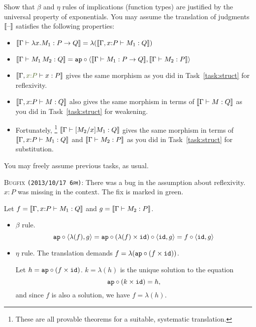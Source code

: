 \documentclass[12pt]{article}
\newcommand{\cut}[1]{}
\newcommand{\showsol}[1]{\color{FireBrick}#1\normalcolor}%
\newcommand{\showsol}[1]{\cut{#1}}%
\newenvironment{sol}{\trivlist \item[\hskip \labelsep{\bf
Solution:}]}{\endtrivlist}
\newcommand{\showextra}[1]{\color{DarkOliveGreen}#1\normalcolor}
\begin{document}
\begin{task}
  Show that $\beta$ and $\eta$ rules of implications (function types)
  are justified by the universal property of exponentials.
  You may assume the translation of judgments $\llbracket \text{--}\rrbracket$
  satisfies the following properties:
  \begin{itemize}
    \item $\llbracket \Gamma \vdash \lambda x.M_1 : P \to Q\rrbracket
      = \lambda (\llbracket \Gamma, x{:}P \vdash M_1 : Q\rrbracket)$
    \item $\llbracket \Gamma \vdash M_1\,M_2 : Q\rrbracket
      = \mathtt{ap} \mathbin{\circ} \langle \llbracket \Gamma \vdash M_1 : P \to Q\rrbracket,\llbracket \Gamma \vdash M_2 : P\rrbracket\rangle$
    \item
      $\sem{\Gamma, \showextra{x{:}P} \entails x : P}$ gives the same morphism
      as you did in Task~\ref{task:struct} for reflexivity.
    \item
      $\llbracket \Gamma, x{:}P \vdash M : Q\rrbracket$ also gives the same morphism
      in terms of $\llbracket \Gamma \vdash M : Q\rrbracket$
      as you did in Task~\ref{task:struct} for weakening.
    \item
      Fortunately,%
      \footnote{These are all provable theorems for a suitable, systematic translation.}
      $\llbracket \Gamma \vdash [M_2/x]M_1 : Q\rrbracket$ gives the same morphism
      in terms of $\llbracket \Gamma, x{:}P \vdash M_1 : Q\rrbracket$ and $\llbracket \Gamma \vdash M_2 : P\rrbracket$
      as you did in Task~\ref{task:struct} for substitution.
  \end{itemize}
  You may freely assume previous tasks, as usual.
\end{task}
\showextra{
  \begin{mdframed}[style=extra]
    \textsc{Bugfix \texttt{(2013/10/17 6pm)}:}
    There was a bug in the assumption about reflexivity.
    $x{:}P$ was missing in the context.
    The fix is marked in green.
  \end{mdframed}
}
\showsol{
  \begin{sol}
    Let $f = \llbracket \Gamma, x{:}P \vdash M_1 : Q\rrbracket$
    and $g = \llbracket \Gamma \vdash M_2 : P\rrbracket$.
    \begin{itemize}
      \item $\beta$ rule.
        \[
          \mathtt{ap} \mathbin{\circ} \langle \lambda(f),g\rangle = \mathtt{ap} \mathbin{\circ} (\lambda(f) \times \mathtt{id}) \mathbin{\circ} \langle \mathtt{id},g\rangle = f \mathbin{\circ} \langle \mathtt{id},g\rangle
        \]
      \item $\eta$ rule.
        The translation demands
        $f = \lambda(\mathtt{ap} \mathbin{\circ} (f \times \mathtt{id}))$.

        Let $h = \mathtt{ap} \mathbin{\circ} (f \times \mathtt{id})$.
        $k = \lambda(h)$ is the unique solution to the equation
        \[
          \mathtt{ap} \mathbin{\circ} (k \times \mathtt{id}) = h,
        \]
        and since $f$ is also a solution, we have $f = \lambda(h)$.
    \end{itemize}
  \end{sol}
}
\end{document}
